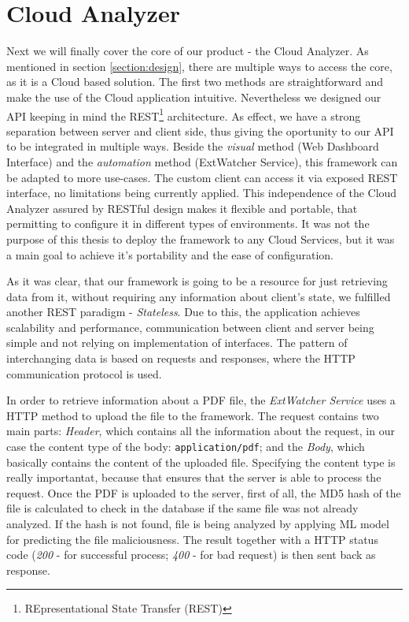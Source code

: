 \section{Cloud Analyzer}
\label{section:cloudApi}
Next we will finally cover the core of our product - the Cloud Analyzer. As mentioned in section \ref{section:design}, there are multiple ways to access the core, as it is a Cloud based solution. The first two methods are straightforward and make the use of the Cloud application intuitive. Nevertheless we designed our API keeping in mind the REST\footnote{REpresentational State Transfer (REST)} architecture. As effect, we have a strong separation between server and client side, thus giving the oportunity to our API to be integrated in multiple ways. Beside the \textit{visual} method (Web Dashboard Interface) and the \textit{automation} method (ExtWatcher Service), this framework can be adapted to more use-cases. The custom client can access it via exposed REST interface, no limitations being currently applied. This independence of the Cloud Analyzer assured by RESTful design makes it flexible and portable, that permitting to configure it in different types of environments. It was not the purpose of this thesis to deploy the framework to any Cloud Services, but it was a main goal to achieve it's portability and the ease of configuration. \par 
As it was clear, that our framework is going to be a resource for just retrieving data from it, without requiring any information about client's state, we fulfilled another REST paradigm - \textit{Stateless}. Due to this, the application achieves scalability and performance, communication between client and server being simple and not relying on implementation of interfaces. The pattern of interchanging data is based on requests and responses, where the HTTP communication protocol is used. \par
In order to retrieve information about a PDF file, the \textit{ExtWatcher Service} uses a  HTTP method to upload the file to the framework. The request contains two main parts: \textit{Header}, which contains all the information about the request, in our case the content type of the body: \texttt{application/pdf}; and the \textit{Body}, which basically contains the content of the uploaded file. Specifying the content type is really importantat, because that ensures that the server is able to process the request. Once the PDF is uploaded to the server, first of all, the MD5 hash of the file is calculated to check in the database if the same file was not already analyzed. If the hash is not found, file is being analyzed by applying ML model for predicting the file maliciousness. The result together with a HTTP status code (\textit{200} - for successful process; \textit{400} - for bad request) is then sent back as response. \par
